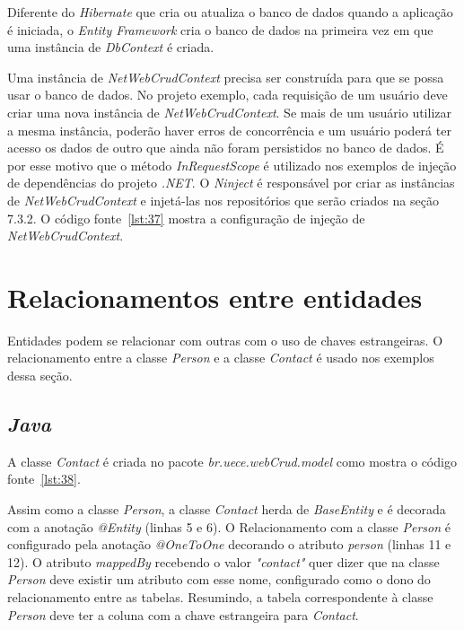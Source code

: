 Diferente do \textit{Hibernate} que cria ou atualiza o banco de dados quando a aplicação é iniciada, o \textit{Entity Framework} cria o banco de dados na primeira vez em que uma instância de \textit{DbContext} é criada.

Uma instância de \textit{NetWebCrudContext} precisa ser construída para que se possa usar o banco de dados. No projeto exemplo, cada requisição de um usuário deve criar uma nova instância de \textit{NetWebCrudContext}. Se mais de um usuário utilizar a mesma instância, poderão haver erros de concorrência e um usuário poderá ter acesso os dados de outro que ainda não foram persistidos no banco de dados. É por esse motivo que o método \textit{InRequestScope} é utilizado nos exemplos de injeção de dependências do projeto \textit{.NET}. O \textit{Ninject} é responsável por criar as instâncias de \textit{NetWebCrudContext} e injetá-las nos repositórios que serão criados na seção 7.3.2. O código fonte~\ref{lst:37} mostra a configuração de injeção de \textit{NetWebCrudContext}.


\section{Relacionamentos entre entidades}

Entidades podem se relacionar com outras com o uso de chaves estrangeiras. O relacionamento entre a classe \textit{Person} e a classe \textit{Contact} é usado nos exemplos dessa seção.

\subsection{\textit{Java}}

A classe \textit{Contact} é criada no pacote \textit{br.uece.webCrud.model} como mostra o código fonte~\ref{lst:38}.


Assim como a classe \textit{Person}, a classe \textit{Contact} herda de \textit{BaseEntity} e é decorada com a anotação \textit{@Entity} (linhas 5 e 6). O Relacionamento com a classe \textit{Person} é configurado pela anotação \textit{@OneToOne} decorando o atributo \textit{person} (linhas 11 e 12). O atributo \textit{mappedBy} recebendo o valor \textit{"contact"} quer dizer que na classe \textit{Person} deve existir um atributo com esse nome, configurado como o dono do relacionamento entre as tabelas. Resumindo, a tabela correspondente à classe \textit{Person} deve ter a coluna com a chave estrangeira para \textit{Contact}.

